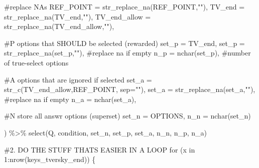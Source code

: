 \documentclass[
  letterpaper,
  DIV=11,
  numbers=noendperiod]{scrreprt}
\newenvironment{Shaded}{\begin{snugshade}}{\end{snugshade}}
\newcommand{\AttributeTok}[1]{\textcolor[rgb]{0.40,0.45,0.13}{#1}}
\newcommand{\CommentTok}[1]{\textcolor[rgb]{0.37,0.37,0.37}{#1}}
\newcommand{\ControlFlowTok}[1]{\textcolor[rgb]{0.00,0.23,0.31}{#1}}
\newcommand{\DecValTok}[1]{\textcolor[rgb]{0.68,0.00,0.00}{#1}}
\newcommand{\FunctionTok}[1]{\textcolor[rgb]{0.28,0.35,0.67}{#1}}
\newcommand{\NormalTok}[1]{\textcolor[rgb]{0.00,0.23,0.31}{#1}}
\newcommand{\SpecialCharTok}[1]{\textcolor[rgb]{0.37,0.37,0.37}{#1}}
\newcommand{\StringTok}[1]{\textcolor[rgb]{0.13,0.47,0.30}{#1}}
\begin{document}
\begin{Shaded}
\begin{Highlighting}[]
    \CommentTok{\#replace NAs }
    \AttributeTok{REF\_POINT =} \FunctionTok{str\_replace\_na}\NormalTok{(REF\_POINT,}\StringTok{""}\NormalTok{),}
    \AttributeTok{TV\_end =} \FunctionTok{str\_replace\_na}\NormalTok{(TV\_end,}\StringTok{""}\NormalTok{),}
    \AttributeTok{TV\_end\_allow =} \FunctionTok{str\_replace\_na}\NormalTok{(TV\_end\_allow,}\StringTok{""}\NormalTok{),}
    
    \CommentTok{\#P options that SHOULD be selected (rewarded)}
    \AttributeTok{set\_p =}\NormalTok{ TV\_end,}
    \AttributeTok{set\_p =} \FunctionTok{str\_replace\_na}\NormalTok{(set\_p,}\StringTok{""}\NormalTok{), }\CommentTok{\#replace na if empty}
    \AttributeTok{n\_p =} \FunctionTok{nchar}\NormalTok{(set\_p), }\CommentTok{\#number of true{-}select options}
    
    \CommentTok{\#A options that are ignored if selected }
    \AttributeTok{set\_a =} \FunctionTok{str\_c}\NormalTok{(TV\_end\_allow,REF\_POINT, }\AttributeTok{sep=}\StringTok{""}\NormalTok{),}
    \AttributeTok{set\_a =} \FunctionTok{str\_replace\_na}\NormalTok{(set\_a,}\StringTok{""}\NormalTok{), }\CommentTok{\#replace na if empty}
    \AttributeTok{n\_a =} \FunctionTok{nchar}\NormalTok{(set\_a),}
    
    \CommentTok{\#N store all answr options (superset)}
    \AttributeTok{set\_n =}\NormalTok{ OPTIONS,  }
    \AttributeTok{n\_n =} \FunctionTok{nchar}\NormalTok{(set\_n)}
  
\NormalTok{) }\SpecialCharTok{\%\textgreater{}\%} \FunctionTok{select}\NormalTok{(Q, condition, set\_n, set\_p, set\_a, n\_n, n\_p, n\_a)}

\CommentTok{\#2. DO THE STUFF THAT\textquotesingle{}S EASIER IN A LOOP}
\ControlFlowTok{for}\NormalTok{ (x }\ControlFlowTok{in} \DecValTok{1}\SpecialCharTok{:}\FunctionTok{nrow}\NormalTok{(keys\_tversky\_end)) \{}
  

\end{Highlighting}
\end{Shaded}
\end{document}
